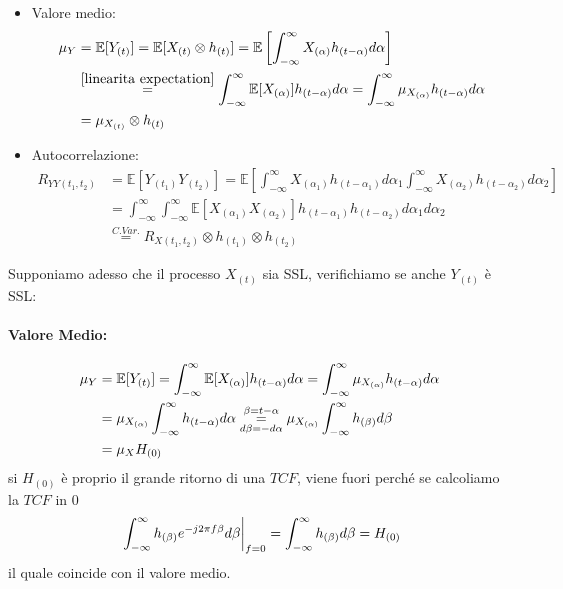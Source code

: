            \begin{itemize}
                \item {
                    Valore medio:
                    \begin{align}
                        \mu_Y &= \mathbb{E}[Y_{(t)}] =\mathbb{E}[X_{(t)} \otimes h_{(t)}] = \mathbb{E}\left[\int_{-\infty}^{\infty} X_{(\alpha)} h_{(t-\alpha)} d\alpha\right]\nonumber \\
                              &\overset{\ref{linearita expectation}}{=} \int_{-\infty}^{\infty} \mathbb{E}[X_{(\alpha)}] h_{(t-\alpha)} d\alpha = \int_{-\infty}^{\infty} \mu_{X_{(\alpha)}} h_{(t-\alpha)} d\alpha  \nonumber \\
                              &=  \mu_{X_{(t)}} \otimes h_{(t)}\nonumber
                    \end{align}
                }
                \item {
                    Autocorrelazione:
                    \begin{align}
                        R_{YY(t_1,t_2)} &= \mathbb{E}[Y_{(t_1)}Y_{(t_2)}] = \mathbb{E}\left[\int_{-\infty}^{\infty} X_{(\alpha_1)} h_{(t-\alpha_1)} d\alpha_1\int_{-\infty}^{\infty} X_{(\alpha_2)} h_{(t-\alpha_2)} d\alpha_2\right]\nonumber \\
                                        &= \int_{-\infty}^{\infty}\int_{-\infty}^{\infty} \mathbb{E}[X_{(\alpha_1)}X_{(\alpha_2)}] h_{(t-\alpha_1)} h_{(t-\alpha_2)} d\alpha_1d\alpha_2\nonumber \\
                                        &\overset{C. Var.}{=} R_{X(t_1,t_2)} \otimes h_{(t_1)}\otimes h_{(t_2)}\nonumber
                    \end{align}
                }
            \end{itemize}
            Supponiamo adesso che il processo $X_{(t)}$ sia SSL, verifichiamo se anche $Y_{(t)}$ è SSL:
            \paragraph{Valore Medio:}
                \begin{align}
                    \mu_Y &= \mathbb{E}[Y_{(t)}] = \int_{-\infty}^{\infty} \mathbb{E}[X_{(\alpha)}] h_{(t-\alpha)} d\alpha = \int_{-\infty}^{\infty} \mu_{X_{(\alpha)}} h_{(t-\alpha)} d\alpha \nonumber \\
                            &= \mu_{X_{(\alpha)}} \int_{-\infty}^{\infty} h_{(t-\alpha)} d\alpha \overunderset{\beta = t-\alpha}{d\beta = -d\alpha}{=} \mu_{X_{(\alpha)}} \int_{-\infty}^{\infty} h_{(\beta)} d\beta\nonumber \\
                            &= \mu_X H_{(0)}\nonumber
                \end{align}
                si $H_{(0)}$ è proprio il grande ritorno di una $TCF$, viene fuori perché se calcoliamo la $TCF$ in $0$
                \[
                    \eval*{\int_{-\infty}^{\infty} h_{(\beta)} e^{-j2\pi f\beta} d\beta}_{f = 0} = \int_{-\infty}^{\infty} h_{(\beta)} d\beta = H_{(0)}
                \]
                il quale coincide con il valore medio.

